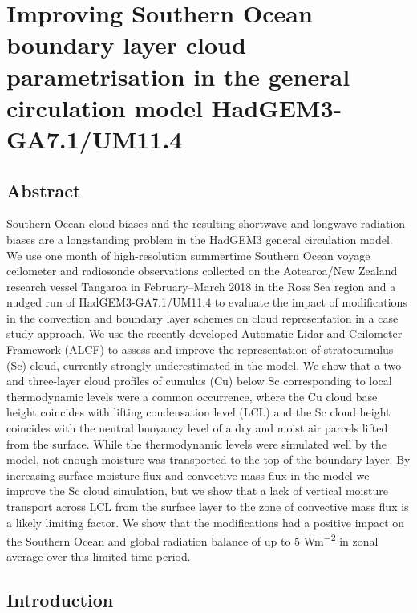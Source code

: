 \chapter{Improving Southern Ocean boundary layer cloud parametrisation in the general circulation model HadGEM3-GA7.1/UM11.4}

\section*{Abstract}

Southern Ocean cloud biases and the resulting shortwave and longwave radiation
biases are a longstanding problem in the HadGEM3 general circulation model. We use one month of high-resolution summertime
Southern Ocean voyage ceilometer and radiosonde observations collected on the Aotearoa/New Zealand research vessel Tangaroa in February--March
2018 in the Ross Sea region
and a nudged run of HadGEM3-GA7.1/UM11.4 to
evaluate the impact of modifications in the convection and boundary layer
schemes on cloud representation in a case study approach. We use the recently-developed Automatic Lidar and Ceilometer Framework (ALCF) to assess and improve the representation of stratocumulus (Sc) cloud,
currently strongly underestimated in the model. We show that a two- and three-layer cloud
profiles of cumulus (Cu) below Sc corresponding to local thermodynamic levels were a common occurrence, where
the Cu cloud base height coincides with lifting condensation level (LCL)
and the Sc cloud height coincides with the neutral buoyancy level of a dry and moist air
parcels lifted from the surface. While the thermodynamic levels were simulated
well by the model, not enough moisture was transported to the top of the boundary layer.
By increasing surface moisture flux and convective mass flux in the model we improve the
Sc cloud simulation, but we show that a lack of vertical moisture transport
across LCL from the surface layer to the zone of convective mass flux is a likely limiting factor.
We show that the modifications had a positive impact on the Southern Ocean and
global radiation balance of up to 5 \unit{Wm^{-2}} in zonal average over this limited time period.

\section{Introduction}

